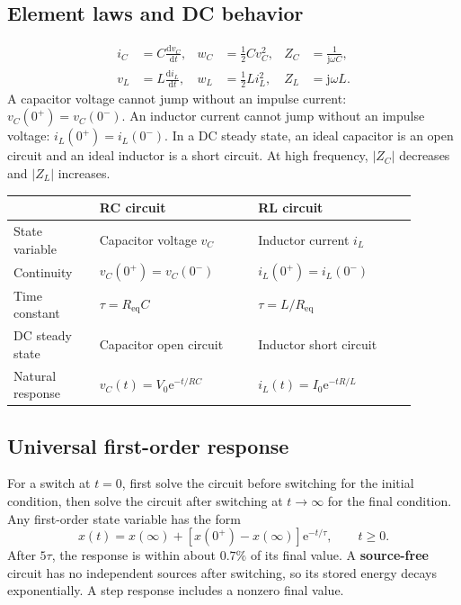 \documentclass[10pt]{article}
\newcommand{\dd}{\mathrm{d}}
\newcommand{\jj}{\mathrm{j}}
\newcommand{\e}{\mathrm{e}}
\newcommand{\abs}[1]{\left|#1\right|}
\begin{document}
\subsection{Element laws and DC behavior}
\begin{align}
 i_C&=C\frac{\dd v_C}{\dd t}, & w_C&=\frac12Cv_C^2, & Z_C&=\frac{1}{\jj\omega C},\\
 v_L&=L\frac{\dd i_L}{\dd t}, & w_L&=\frac12Li_L^2, & Z_L&=\jj\omega L.
\end{align}
A capacitor voltage cannot jump without an impulse current:
$v_C(0^+)=v_C(0^-)$. An inductor current cannot jump without an impulse voltage:
$i_L(0^+)=i_L(0^-)$. In a DC steady state, an ideal capacitor is an open circuit
and an ideal inductor is a short circuit. At high frequency, $\abs{Z_C}$ decreases
and $\abs{Z_L}$ increases.

\begin{center}
\begin{tabular}{p{0.19\linewidth}p{0.35\linewidth}p{0.35\linewidth}}
\toprule
 & RC circuit & RL circuit \\
\midrule
State variable & Capacitor voltage $v_C$ & Inductor current $i_L$ \\
Continuity & $v_C(0^+)=v_C(0^-)$ & $i_L(0^+)=i_L(0^-)$ \\
Time constant & $\tau=R_{\mathrm{eq}}C$ & $\tau=L/R_{\mathrm{eq}}$ \\
DC steady state & Capacitor open circuit & Inductor short circuit \\
Natural response & $v_C(t)=V_0\e^{-t/RC}$ & $i_L(t)=I_0\e^{-tR/L}$ \\
\bottomrule
\end{tabular}
\end{center}

\subsection{Universal first-order response}
For a switch at $t=0$, first solve the circuit before switching for the initial
condition, then solve the circuit after switching at $t\to\infty$ for the final
condition. Any first-order state variable has the form
\begin{equation}
 x(t)=x(\infty)+\left[x(0^+)-x(\infty)\right]\e^{-t/\tau},\qquad t\ge0.
\end{equation}
After $5\tau$, the response is within about $0.7\%$ of its final value. A
\textbf{source-free} circuit has no independent sources after switching, so its
stored energy decays exponentially. A step response includes a nonzero final value.
\end{document}
